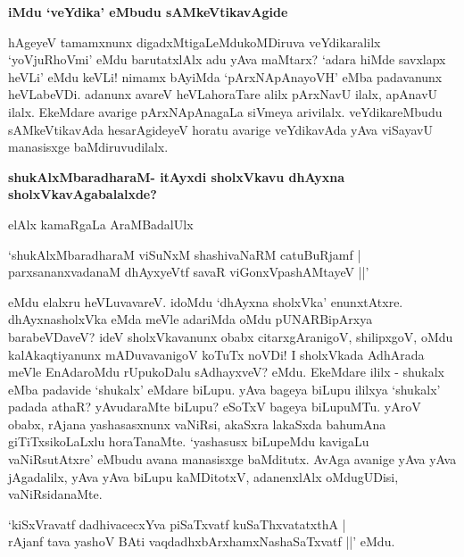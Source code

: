 \noindent
{\bf\large{iMdu `veYdika' eMbudu sAMkeVtikavAgide}}\label{page206}

hAgeyeV tamamxnunx digadxMtigaLeMdukoMDiruva veYdikaralilx `yoVjuRhoVmi' eMdu barutatxlAlx adu yAva maMtarx? `adara hiMde savxlapx heVLi' eMdu keVLi! nimamx bAyiMda `pArxNApAnayoVH' eMba padavanunx heVLabeVDi. adanunx avareV heVLahoraTare alilx pArxNavU ilalx, apAnavU ilalx. EkeMdare avarige pArxNApAnagaLa siVmeya arivilalx. veYdikareMbudu sAMkeVtikavAda hesarAgideyeV horatu avarige veYdikavAda yAva viSayavU manasisxge baMdiruvudilalx.

\noindent
{\bf\large{shukAlxMbaradharaM- itAyxdi sholxVkavu dhAyxna sholxVkavAgabalalxde?}}\label{page206}

elAlx kamaRgaLa AraMBadalUlx

\begin{shloka}
`shukAlxMbaradharaM viSuNxM shashivaNaRM catuBuRjamf |\\\label{157}
parxsananxvadanaM dhAyxyeVtf savaR viGonxVpashAMtayeV ||'
\end{shloka}

eMdu elalxru heVLuvavareV. idoMdu `dhAyxna sholxVka' enunxtAtxre. dhAyxnasholxVka eMda meVle adariMda oMdu pUNARBipArxya barabeVDaveV? ideV sholxVkavanunx obabx citarxgAranigoV, shilipxgoV, oMdu kalAkaqtiyanunx mADuvavanigoV koTuTx noVDi! I sholxVkada AdhArada meVle EnAdaroMdu rUpukoDalu sAdhayxveV? eMdu. EkeMdare ililx - shukalx eMba padavide `shukalx' eMdare biLupu. yAva bageya biLupu ililxya `shukalx' padada athaR? yAvudaraMte biLupu? eSoTxV bageya biLupuMTu. yAroV obabx, rAjana yashasasxnunx vaNiRsi, akaSxra lakaSxda bahumAna giTiTxsikoLaLxlu horaTanaMte. `yashasusx biLupeMdu kavigaLu vaNiRsutAtxre' eMbudu avana manasisxge baMditutx. AvAga avanige yAva yAva jAgadalilx, yAva yAva biLupu kaMDitotxV, adanenxlAlx oMdugUDisi, vaNiRsidanaMte.

\begin{shloka}
`kiSxVravatf dadhivacecxYva piSaTxvatf kuSaThxvatatxthA |\\\label{207}
rAjanf tava yashoV BAti vaqdadhxbArxhamxNashaSaTxvatf ||' eMdu.
\end{shloka}

